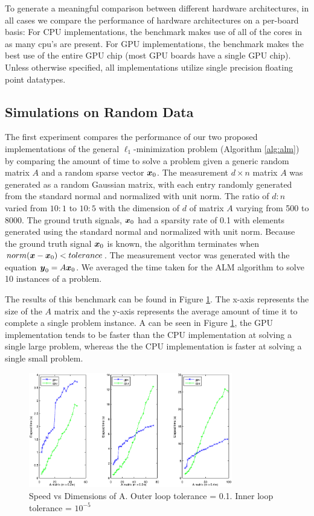 \documentclass[10pt,twocolumn,letterpaper]{article}
\begin{document}
To generate a meaningful comparison between different hardware architectures,
in all cases we compare the performance of hardware architectures on a
per-board basis:  For CPU implementations, the benchmark makes use of all of
the cores in as many cpu's are present.  For GPU implementations, the benchmark
makes the best use of the entire GPU chip (most GPU boards have a single GPU
chip).  Unless otherwise specified, all implementations utilize single
precision floating point datatypes.  

\subsection{Simulations on Random Data}
\label{sec:simulation}

The first experiment compares the performance of our two proposed implementations of 
the general $\ell_1$-minimization problem (Algorithm \eqref{alg:alm}) by
comparing the amount of time to solve a problem given a generic random matrix $A$ and a random sparse
vector ${\boldsymbol{x}}_0$.  
The measurement $d \times n$ matrix $A$ was generated as a random Gaussian matrix, with each entry
randomly generated from the standard normal and normalized with unit norm.  The ratio of $d:n$ varied from
$10:1$ to $10:5$ with the dimension of $d$ of matrix $A$ varying from 500 to 8000.
The ground truth signals, ${\boldsymbol{x}}_0$ had a sparsity rate of 0.1 with elements generated using the standard normal and normalized with unit norm.
Because the ground truth signal ${\boldsymbol{x}}_0$ is known, the algorithm terminates
when $norm({\boldsymbol x}-{\boldsymbol x}_0) < tolerance$.
The measurement vector was generated with the equation $\boldsymbol{y}_0 = A {\boldsymbol{x}}_0$.   
We averaged the time taken for the ALM algorithm to solve 10 instances of a problem.  

The results of this benchmark can be found in Figure \ref{fig:random_data}.
The x-axis represents the size of the $A$ matrix and the y-axis represents the
average amount of time it to complete a single problem instance.  A can be seen
in Figure \ref{fig:random_data}, the GPU implementation tends to be faster than
the CPU implementation at solving a single large problem, whereas the the CPU
implementation is faster at solving a single small problem.  
\begin{figure}
\begin{center}
\includegraphics[width=3.5in]{results/random_data/time_vs_matrix_size_constant_tol}
\end{center}
\caption{Speed vs Dimensions of A.  Outer loop tolerance = 0.1.  Inner loop tolerance = $10^{-5}$}
\label{fig:random_data}
\end{figure}
\end{document}

